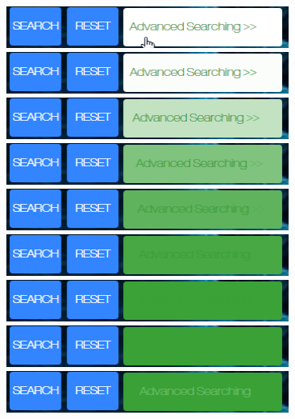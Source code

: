 \documentclass[10pt,twoside,a4paper,titlepage]{article}
\begin{document}
	\includegraphics[width=0.7\textwidth]{cyf/Advanced_searching19.png}
	\newline	
	\includegraphics[width=0.7\textwidth]{cyf/Advanced_searching20.png}
	\newline	
	\includegraphics[width=0.7\textwidth]{cyf/Advanced_searching21.png}
	\newline	
	\includegraphics[width=0.7\textwidth]{cyf/Advanced_searching22.png}
	\newline	
	\includegraphics[width=0.7\textwidth]{cyf/Advanced_searching23.png}
	\newline	
	\includegraphics[width=0.7\textwidth]{cyf/Advanced_searching24.png}
	\newline	
	\includegraphics[width=0.7\textwidth]{cyf/Advanced_searching25.png}
	\newline	
	\includegraphics[width=0.7\textwidth]{cyf/Advanced_searching26.png}
	\newline	
	\includegraphics[width=0.7\textwidth]{cyf/Advanced_searching27.png}
\end{document}
